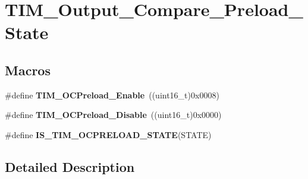 \hypertarget{group___t_i_m___output___compare___preload___state}{\section{T\-I\-M\-\_\-\-Output\-\_\-\-Compare\-\_\-\-Preload\-\_\-\-State}
\label{group___t_i_m___output___compare___preload___state}
}
\subsection*{Macros}
\begin{DoxyCompactItemize}
\item 
\hypertarget{group___t_i_m___output___compare___preload___state_gad647db2e7a89bd6db3c787680afccf8f}{\#define {\bfseries T\-I\-M\-\_\-\-O\-C\-Preload\-\_\-\-Enable}~((uint16\-\_\-t)0x0008)}\label{group___t_i_m___output___compare___preload___state_gad647db2e7a89bd6db3c787680afccf8f}

\item 
\hypertarget{group___t_i_m___output___compare___preload___state_ga0cbcc3c4d90d61d85550db2173737ed6}{\#define {\bfseries T\-I\-M\-\_\-\-O\-C\-Preload\-\_\-\-Disable}~((uint16\-\_\-t)0x0000)}\label{group___t_i_m___output___compare___preload___state_ga0cbcc3c4d90d61d85550db2173737ed6}

\item 
\#define {\bfseries I\-S\-\_\-\-T\-I\-M\-\_\-\-O\-C\-P\-R\-E\-L\-O\-A\-D\-\_\-\-S\-T\-A\-T\-E}(S\-T\-A\-T\-E)
\end{DoxyCompactItemize}


\subsection{Detailed Description}


